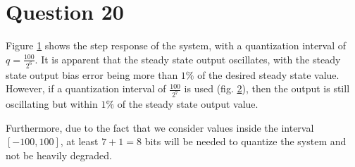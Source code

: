\section{Question 20}

Figure \ref{fig:20.6b} shows the step response of the system, with a quantization
interval of $q=\frac{100}{2^6}$. It is apparent that the steady state output
oscillates, with the steady state output bias error being more than $1\%$ of
the desired steady state value. However, if a quantization interval of
$\frac{100}{2^7}$ is used (fig. \ref{fig:20.7b}), then the output is still
oscillating but within $1\%$ of the steady state output value.

Furthermore, due to the fact that we consider values inside the interval
$[-100, 100]$, at least $7+1 = 8$ bits will be needed to quantize the system and
not be heavily degraded.

\begin{figure}[H]\centering
	\centering
	\scalebox{0.8}{}
  \caption{}
  \label{fig:20.6b}
\end{figure}

\begin{figure}[H]\centering
	\centering
	\scalebox{0.8}{}
  \caption{}
  \label{fig:20.7b}
\end{figure}

